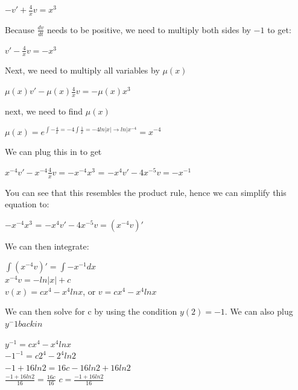 \documentclass{article}
\begin{document}
\begin{center}
    $-v' + \frac{4}{x} v = x^3$
\end{center}

Because $\frac{dv}{dt}$ needs to be positive, we need to multiply both sides by $-1$ to get:

\begin{center}
    $v' - \frac{4}{x} v = -x^3$ \\
\end{center}

Next, we need to multiply all variables by $\mu(x)$

\begin{center}
    $\mu(x)v' - \mu(x)\frac{4}{x} v = -\mu(x)x^3$ \\
\end{center}

next, we need to find $\mu(x)$

$\mu(x) = e^{\int -\frac{4}{x} = -4\int\frac{1}{x} = -4 ln |x| \rightarrow ln|x^{-4}} = x^{-4}$

We can plug this in to get

\begin{center}
    $x^{-4}v' - x^{-4}\frac{4}{x} v = -x^{-4}x^3$ = $-x^4v' - 4x^{-5}v = -x^{-1}$ \\
\end{center}

You can see that this resembles the product rule, hence we can simplify this equation to:

$-x^{-4}x^3$ = $-x^4v' - 4x^{-5}v = (x^{-4}v)'$

We can then integrate:

\begin{center}
    $\int (x^{-4}v)' = \int -x^{-1}dx$ \\
    $x^{-4}v = -ln|x| + c$ \\
    $v(x) = cx^4 - x^4 ln x$, or $v = cx^4 - x^4 ln x$
\end{center}

We can then solve for c by using the condition $y(2) = -1$. We can also plug $y^-1 back in$

\begin{center}
    $y^{-1} = cx^4 - x^4 ln x$ \\
    $-1^{-1} = c2^4 - 2^4 ln 2$ \\
    $-1 + 16 ln 2 = 16c - 16 ln 2 + 16 ln 2$ \\
    $\frac{-1 + 16 ln 2 }{16}= \frac{16c}{16}$
    $c = \frac{-1 + 16ln 2}{16}$

\end{center}
\end{document}
